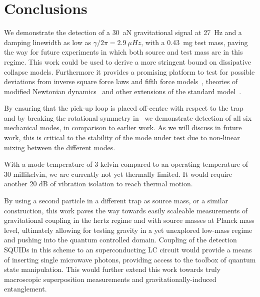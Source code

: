 \section{Conclusions}\label{sec:conclusions}
We demonstrate the detection of a \SI{30}{aN} gravitational signal at \SI{27}{Hz} and a damping linewidth as low as $\gamma/2\pi = \SI{2.9}{\mu Hz}$, with a \SI{0.43}{mg} test mass, paving the way for future experiments in which both source and test mass are in this regime. This work could be used to derive a more stringent bound on dissipative collapse models. Furthermore it provides a promising platform to test for possible deviations from inverse square force laws and fifth force models~\cite{Blakemore2021, smullin2005}, theories of modified Newtonian dynamics~\cite{milgrom1983, bekenstein2004} and other extensions of the standard model~\cite{carney2021}.

By ensuring that the pick-up loop is placed off-centre with respect to the trap and by breaking the rotational symmetry in \textgamma\ we demonstrate detection of all six mechanical modes, in comparison to earlier work. As we will discuss in future work, this is critical to the stability of the mode under test due to non-linear mixing between the different modes.

With a mode temperature of 3 kelvin compared to an operating temperature of 30 millikelvin, we are currently not yet thermally limited.
It would require another 20 dB of vibration isolation to reach thermal motion.

By using a second particle in a different trap as source mass, or a similar construction, this work paves the way towards easily scaleable measurements of gravitational coupling in the hertz regime and with source masses at Planck mass level, ultimately allowing for testing gravity in a yet unexplored low-mass regime and pushing into the quantum controlled domain. Coupling of the detection SQUIDs in this scheme to an superconducting LC circuit would provide a means of inserting single microwave photons, providing access to the toolbox of quantum state manipulation. This would further extend this work towards truly macroscopic superposition measurements and gravitationally-induced entanglement.

